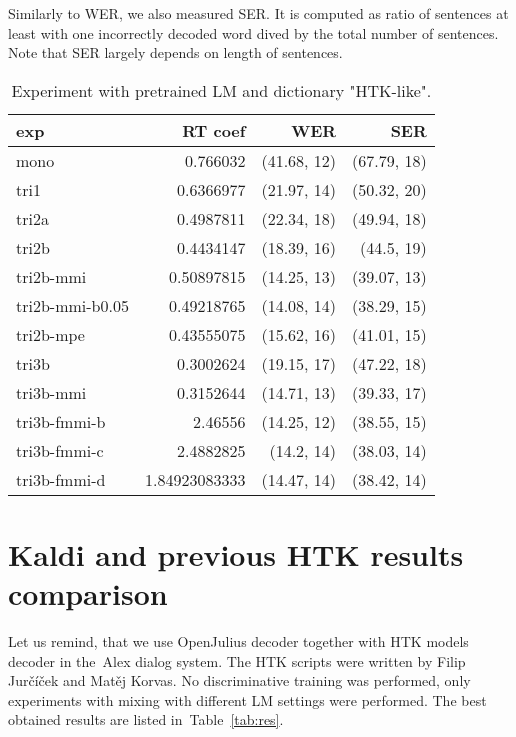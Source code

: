 {Similarly to \ac{WER}, we also measured \ac{SER}. It is computed as ratio of sentences at least with one incorrectly decoded word dived by the total number of sentences. Note that \ac{SER} largely depends on length of sentences. 

\begin{table}[!htp]\label{tab:htk_like}\centering\begin{tabular}{l|rrr}
exp             & RT coef       & WER         & SER        \\ 
\hline
mono            & 0.766032      & (41.68, 12) & (67.79, 18)\\ 
tri1            & 0.6366977     & (21.97, 14) & (50.32, 20)\\ 
tri2a           & 0.4987811     & (22.34, 18) & (49.94, 18)\\ 
tri2b           & 0.4434147     & (18.39, 16) & (44.5, 19) \\ 
tri2b-mmi       & 0.50897815    & (14.25, 13) & (39.07, 13)\\ 
tri2b-mmi-b0.05 & 0.49218765    & (14.08, 14) & (38.29, 15)\\ 
tri2b-mpe       & 0.43555075    & (15.62, 16) & (41.01, 15)\\ 
tri3b           & 0.3002624     & (19.15, 17) & (47.22, 18)\\ 
tri3b-mmi       & 0.3152644     & (14.71, 13) & (39.33, 17)\\ 
tri3b-fmmi-b    & 2.46556       & (14.25, 12) & (38.55, 15)\\ 
tri3b-fmmi-c    & 2.4882825     & (14.2, 14)  & (38.03, 14)\\ 
tri3b-fmmi-d    & 1.84923083333 & (14.47, 14) & (38.42, 14)
\end{tabular}
\caption{Experiment with pretrained LM and dictionary "\ac{HTK}-like".}
\end{table}  


\section[Kaldi and \acs{HTK} comparison]{Kaldi and previous \ac{HTK} results comparison} 
\label{sec:compare}

Let us remind, that we use OpenJulius decoder together with HTK models decoder in the~Alex dialog system.
The \ac{HTK} scripts were written by Filip Jurčíček and Matěj Korvas. No discriminative training was performed,
only experiments with mixing with different \acl{LM} settings were performed. 
The best obtained results are listed in~Table~\ref{tab:res}.

}
